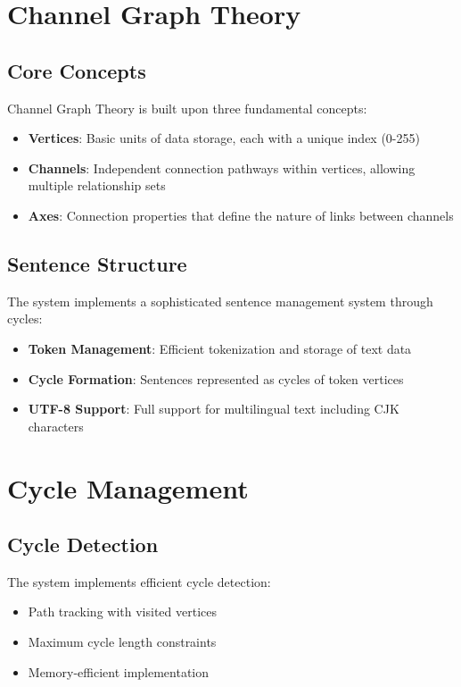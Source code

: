 \section{Channel Graph Theory}\label{Sec:Theory}
\subsection{Core Concepts}
Channel Graph Theory is built upon three fundamental concepts:
\begin{itemize}
    \item \textbf{Vertices}: Basic units of data storage, each with a unique index (0-255)
    \item \textbf{Channels}: Independent connection pathways within vertices, allowing multiple relationship sets
    \item \textbf{Axes}: Connection properties that define the nature of links between channels
\end{itemize}

\subsection{Sentence Structure}
The system implements a sophisticated sentence management system through cycles:
\begin{itemize}
    \item \textbf{Token Management}: Efficient tokenization and storage of text data
    \item \textbf{Cycle Formation}: Sentences represented as cycles of token vertices
    \item \textbf{UTF-8 Support}: Full support for multilingual text including CJK characters
\end{itemize}

\section{Cycle Management}\label{Sec:Cycles}
\subsection{Cycle Detection}
The system implements efficient cycle detection:
\begin{itemize}
    \item Path tracking with visited vertices
    \item Maximum cycle length constraints
    \item Memory-efficient implementation
\end{itemize}

